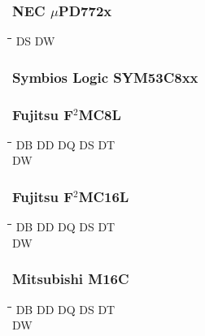 \subsubsection{NEC $\mu$PD772x}
{\tt\begin{tabbing} 
\hspace{3cm}\=\hspace{3cm}\=\hspace{3cm}\=\hspace{3cm}\=\kill
DS         \> DW \\
\end{tabbing}}

\subsubsection{Symbios Logic SYM53C8xx}
{\tt\begin{tabbing} 
\end{tabbing}}

\subsubsection{Fujitsu F$^{2}$MC8L}
{\tt\begin{tabbing} 
\hspace{3cm}\=\hspace{3cm}\=\hspace{3cm}\=\hspace{3cm}\=\kill
DB         \> DD          \> DQ          \> DS          \> DT \\
DW \\
\end{tabbing}}

\subsubsection{Fujitsu F$^{2}$MC16L}
{\tt\begin{tabbing} 
\hspace{3cm}\=\hspace{3cm}\=\hspace{3cm}\=\hspace{3cm}\=\kill
DB         \> DD          \> DQ          \> DS          \> DT \\
DW \\
\end{tabbing}}

\subsubsection{Mitsubishi M16C}
{\tt\begin{tabbing}
\hspace{3cm}\=\hspace{3cm}\=\hspace{3cm}\=\hspace{3cm}\=\kill
DB         \> DD          \> DQ          \> DS          \> DT \\
DW \\
\end{tabbing}}

